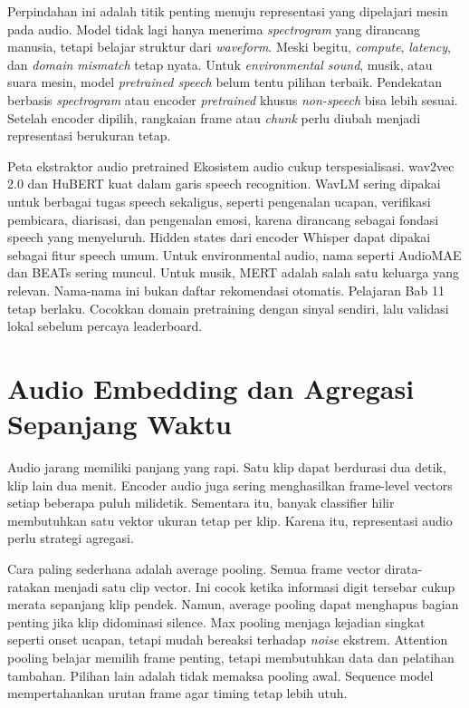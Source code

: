 Perpindahan ini adalah titik penting menuju representasi yang dipelajari mesin pada audio. Model tidak lagi hanya menerima \emph{spectrogram} yang dirancang manusia, tetapi belajar struktur dari \emph{waveform}. Meski begitu, \emph{compute}, \emph{latency}, dan \emph{domain mismatch} tetap nyata. Untuk \emph{environmental sound}, musik, atau suara mesin, model \emph{pretrained speech} belum tentu pilihan terbaik. Pendekatan berbasis \emph{spectrogram} atau encoder \emph{pretrained} khusus \emph{non-speech} bisa lebih sesuai. Setelah encoder dipilih, rangkaian frame atau \emph{chunk} perlu diubah menjadi representasi berukuran tetap.

\begin{pendalaman}{Peta ekstraktor audio pretrained}
Ekosistem audio cukup terspesialisasi. wav2vec 2.0 dan HuBERT kuat dalam garis speech recognition. WavLM sering dipakai untuk berbagai tugas speech sekaligus, seperti pengenalan ucapan, verifikasi pembicara, diarisasi, dan pengenalan emosi, karena dirancang sebagai fondasi speech yang menyeluruh. Hidden states dari encoder Whisper dapat dipakai sebagai fitur speech umum. Untuk environmental audio, nama seperti AudioMAE dan BEATs sering muncul. Untuk musik, MERT adalah salah satu keluarga yang relevan. Nama-nama ini bukan daftar rekomendasi otomatis. Pelajaran Bab 11 tetap berlaku. Cocokkan domain pretraining dengan sinyal sendiri, lalu validasi lokal sebelum percaya leaderboard.
\end{pendalaman}

\section{Audio Embedding dan Agregasi Sepanjang Waktu}\label{audio-embedding-dan-agregasi-sepanjang-waktu}

Audio jarang memiliki panjang yang rapi. Satu klip dapat berdurasi dua detik, klip lain dua menit. Encoder audio juga sering menghasilkan frame-level vectors setiap beberapa puluh milidetik. Sementara itu, banyak classifier hilir membutuhkan satu vektor ukuran tetap per klip. Karena itu, representasi audio perlu strategi agregasi.

Cara paling sederhana adalah average pooling. Semua frame vector dirata-ratakan menjadi satu clip vector. Ini cocok ketika informasi digit tersebar cukup merata sepanjang klip pendek. Namun, average pooling dapat menghapus bagian penting jika klip didominasi silence. Max pooling menjaga kejadian singkat seperti onset ucapan, tetapi mudah bereaksi terhadap \emph{noise} ekstrem. Attention pooling belajar memilih frame penting, tetapi membutuhkan data dan pelatihan tambahan. Pilihan lain adalah tidak memaksa pooling awal. Sequence model mempertahankan urutan frame agar timing tetap lebih utuh.

